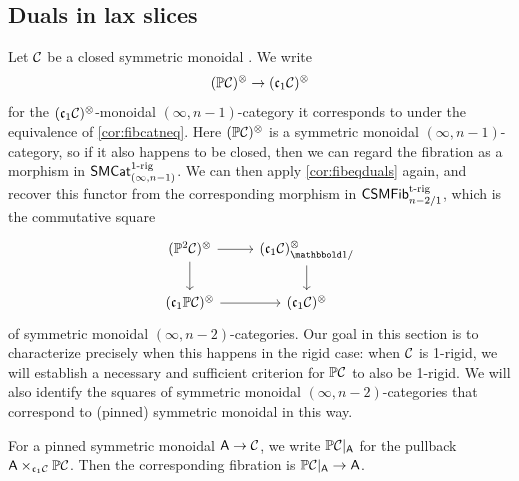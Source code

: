 \documentclass[a4paper,11pt]{article}
\begin{document}
\subsection{Duals in lax slices}\label{sec:dual lax slice}
Let $\mathcal{C}$ be a closed symmetric monoidal \incat{}. We write
\[ (\mP\nC)^{\otimes} \to (\core\nC)^{\otimes} \]
for the $(\mathfrak{c}_{1} \mathcal{C})^{\otimes}$-monoidal $(\infty,n-1)$-category it
corresponds to under the equivalence of \cref{cor:fibcatneq}.
Here
$(\mathbb{P}\mathcal{C})^{\otimes}$ is a symmetric monoidal $(\infty,n-1)$-category,
so if it also happens to be closed, then we can regard the fibration
as a morphism in $\textup{\textsf{SMCat}}_{(\infty,n-1)}^{1\text{\textup{-rig}}}$. We can then
apply \cref{cor:fibeqduals} again, and recover this functor from the
corresponding morphism in $\textup{\textsf{CSMFib}}_{n-2/1}^{\text{\textup{t-rig}}}$, which is the
commutative square
\[
  \begin{tikzcd}
    (\mP^{2} \nC)^{\otimes} \ar[r] \ar[d] & (\core\nC)_{\bbone/}^{\otimes} \ar[d] \\
    (\core\mP\nC)^{\otimes} \ar[r] & (\core \nC)^{\otimes}
  \end{tikzcd}
\]
of symmetric monoidal $(\infty,n-2)$-categories.
Our goal in this section is to characterize precisely when this happens in the rigid case:
when $\mathcal{C}$ is 1-rigid, we will establish a necessary and sufficient
criterion for $\mathbb{P}\mathcal{C}$ to also be 1-rigid. We will also 
identify the squares of symmetric monoidal $(\infty,n-2)$-categories that correspond to (pinned)
symmetric monoidal \incats{} in this way.


\begin{notation}
  For a pinned symmetric monoidal \incat{} $\oA \to \nC$, we write
  $\mathbb{P}\mathcal{C}|_{\textup{\textsf{A}}}$ for the pullback $\textup{\textsf{A}} \times_{\mathfrak{c}_{1} \mathcal{C}}
  \mathbb{P}\mathcal{C}$. Then the corresponding fibration is $\mP\nC|_{\oA} \to \oA$.
\end{notation}
\end{document}
